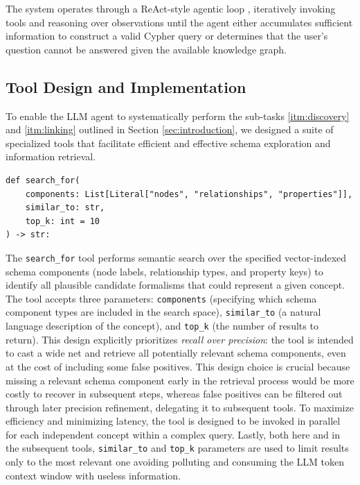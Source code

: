 The system operates through a ReAct-style agentic loop \cite{yao-etal-2023-react}, iteratively invoking tools and reasoning over observations until the agent either accumulates sufficient information to construct a valid Cypher query or determines that the user's question cannot be answered given the available knowledge graph.

\subsection{Tool Design and Implementation}

To enable the LLM agent to systematically perform the sub-tasks \ref{itm:discovery} and \ref{itm:linking} outlined in Section \ref{sec:introduction}, we designed a suite of specialized tools that facilitate efficient and effective schema exploration and information retrieval.%
%
\begin{verbatim}
def search_for(
    components: List[Literal["nodes", "relationships", "properties"]],
    similar_to: str,
    top_k: int = 10
) -> str:
\end{verbatim}
%
The \verb|search_for| tool performs semantic search over the specified vector-indexed schema components (node labels, relationship types, and property keys) to identify all plausible candidate formalisms that could represent a given concept. The tool accepts three parameters: \verb|components| (specifying which schema component types are included in the search space), \verb|similar_to| (a natural language description of the concept), and \verb|top_k| (the number of results to return). This design explicitly prioritizes \textit{recall over precision}: the tool is intended to cast a wide net and retrieve all potentially relevant schema components, even at the cost of including some false positives. This design choice is crucial because missing a relevant schema component early in the retrieval process would be more costly to recover in subsequent steps, whereas false positives can be filtered out through later precision refinement, delegating it to subsequent tools. To maximize efficiency and minimizing latency, the tool is designed to be invoked in parallel for each independent concept within a complex query. Lastly, both here and in the subsequent tools, \verb|similar_to| and \verb|top_k| parameters are used to limit results only to the most relevant one avoiding polluting and consuming the LLM token context window with useless information.%
%
